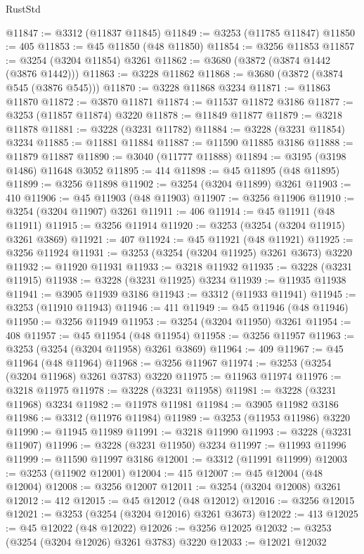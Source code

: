 \begin{lexlean}{RustStd}
\begin{coremodule}
@11847 := @3312 (@11837 @11845)
@11849 := @3253 (@11785 @11847)
@11850 := 405
@11853 := @45 @11850 (@48 @11850)
@11854 := @3256 @11853
@11857 := @3254 (@3204 @11854) @3261
@11862 := @3680 (@3872 (@3874 @1442 (@3876 @1442)))
@11863 := @3228 @11862
@11868 := @3680 (@3872 (@3874 @545 (@3876 @545)))
@11870 := @3228 @11868 @3234
@11871 := @11863 @11870
@11872 := @3870 @11871
@11874 := @11537 @11872 @3186
@11877 := @3253 (@11857 @11874) @3220
@11878 := @11849 @11877
@11879 := @3218 @11878
@11881 := @3228 (@3231 @11782)
@11884 := @3228 (@3231 @11854) @3234
@11885 := @11881 @11884
@11887 := @11590 @11885 @3186
@11888 := @11879 @11887
@11890 := @3040 (@11777 @11888)
@11894 := @3195 (@3198 @1486) @11648 @3052
@11895 := 414
@11898 := @45 @11895 (@48 @11895)
@11899 := @3256 @11898
@11902 := @3254 (@3204 @11899) @3261
@11903 := 410
@11906 := @45 @11903 (@48 @11903)
@11907 := @3256 @11906
@11910 := @3254 (@3204 @11907) @3261
@11911 := 406
@11914 := @45 @11911 (@48 @11911)
@11915 := @3256 @11914
@11920 := @3253 (@3254 (@3204 @11915) @3261 @3869)
@11921 := 407
@11924 := @45 @11921 (@48 @11921)
@11925 := @3256 @11924
@11931 := @3253 (@3254 (@3204 @11925) @3261 @3673) @3220
@11932 := @11920 @11931
@11933 := @3218 @11932
@11935 := @3228 (@3231 @11915)
@11938 := @3228 (@3231 @11925) @3234
@11939 := @11935 @11938
@11941 := @3905 @11939 @3186
@11943 := @3312 (@11933 @11941)
@11945 := @3253 (@11910 @11943)
@11946 := 411
@11949 := @45 @11946 (@48 @11946)
@11950 := @3256 @11949
@11953 := @3254 (@3204 @11950) @3261
@11954 := 408
@11957 := @45 @11954 (@48 @11954)
@11958 := @3256 @11957
@11963 := @3253 (@3254 (@3204 @11958) @3261 @3869)
@11964 := 409
@11967 := @45 @11964 (@48 @11964)
@11968 := @3256 @11967
@11974 := @3253 (@3254 (@3204 @11968) @3261 @3783) @3220
@11975 := @11963 @11974
@11976 := @3218 @11975
@11978 := @3228 (@3231 @11958)
@11981 := @3228 (@3231 @11968) @3234
@11982 := @11978 @11981
@11984 := @3905 @11982 @3186
@11986 := @3312 (@11976 @11984)
@11989 := @3253 (@11953 @11986) @3220
@11990 := @11945 @11989
@11991 := @3218 @11990
@11993 := @3228 (@3231 @11907)
@11996 := @3228 (@3231 @11950) @3234
@11997 := @11993 @11996
@11999 := @11590 @11997 @3186
@12001 := @3312 (@11991 @11999)
@12003 := @3253 (@11902 @12001)
@12004 := 415
@12007 := @45 @12004 (@48 @12004)
@12008 := @3256 @12007
@12011 := @3254 (@3204 @12008) @3261
@12012 := 412
@12015 := @45 @12012 (@48 @12012)
@12016 := @3256 @12015
@12021 := @3253 (@3254 (@3204 @12016) @3261 @3673)
@12022 := 413
@12025 := @45 @12022 (@48 @12022)
@12026 := @3256 @12025
@12032 := @3253 (@3254 (@3204 @12026) @3261 @3783) @3220
@12033 := @12021 @12032

\end{coremodule}
\end{lexlean}
